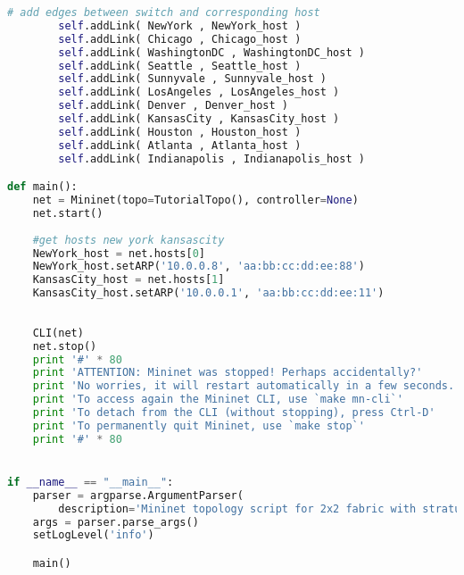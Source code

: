 \begin{lstlisting}[language=Python]
        # add edges between switch and corresponding host
        self.addLink( NewYork , NewYork_host )
        self.addLink( Chicago , Chicago_host )
        self.addLink( WashingtonDC , WashingtonDC_host )
        self.addLink( Seattle , Seattle_host )
        self.addLink( Sunnyvale , Sunnyvale_host )
        self.addLink( LosAngeles , LosAngeles_host )
        self.addLink( Denver , Denver_host )
        self.addLink( KansasCity , KansasCity_host )
        self.addLink( Houston , Houston_host )
        self.addLink( Atlanta , Atlanta_host )
        self.addLink( Indianapolis , Indianapolis_host )

def main():
    net = Mininet(topo=TutorialTopo(), controller=None)
    net.start()
    
    #get hosts new york kansascity
    NewYork_host = net.hosts[0]
    NewYork_host.setARP('10.0.0.8', 'aa:bb:cc:dd:ee:88')
    KansasCity_host = net.hosts[1]
    KansasCity_host.setARP('10.0.0.1', 'aa:bb:cc:dd:ee:11')
   
    
    CLI(net)
    net.stop()
    print '#' * 80
    print 'ATTENTION: Mininet was stopped! Perhaps accidentally?'
    print 'No worries, it will restart automatically in a few seconds...'
    print 'To access again the Mininet CLI, use `make mn-cli`'
    print 'To detach from the CLI (without stopping), press Ctrl-D'
    print 'To permanently quit Mininet, use `make stop`'
    print '#' * 80


if __name__ == "__main__":
    parser = argparse.ArgumentParser(
        description='Mininet topology script for 2x2 fabric with stratum_bmv2 and IPv4 hosts')
    args = parser.parse_args()
    setLogLevel('info')

    main()
\end{lstlisting}